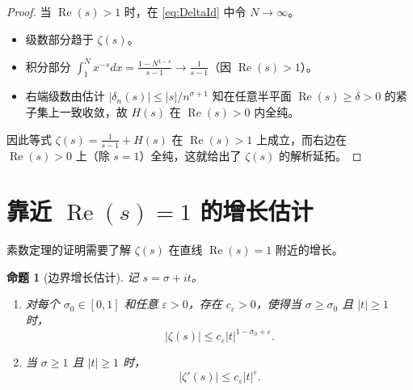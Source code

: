 \documentclass[UTF8]{ctexart}
\newtheorem{proposition}[theorem]{命题}
\numberwithin{equation}{section}
\begin{document}
\begin{proof}
当 $\operatorname{Re}(s)>1$ 时，在 \eqref{eq:DeltaId} 中令 $N\to\infty$。
\begin{itemize}
\item 级数部分趋于 $\zeta(s)$。
\item 积分部分 $\int_{1}^{N} x^{-s}dx = \frac{1-N^{1-s}}{s-1} \to \frac{1}{s-1}$（因 $\operatorname{Re}(s)>1$）。
\item 右端级数由估计 $|\delta_n(s)|\le |s|/n^{\sigma+1}$ 知在任意半平面 $\operatorname{Re}(s)\ge\delta>0$ 的紧子集上一致收敛，故 $H(s)$ 在 $\operatorname{Re}(s)>0$ 内全纯。
\end{itemize}
因此等式 $\zeta(s) = \frac{1}{s-1} + H(s)$ 在 $\operatorname{Re}(s)>1$ 上成立，而右边在 $\operatorname{Re}(s)>0$ 上（除 $s=1$）全纯，这就给出了 $\zeta(s)$ 的解析延拓。
\end{proof}

\section{靠近 $\operatorname{Re}(s)=1$ 的增长估计}

素数定理的证明需要了解 $\zeta(s)$ 在直线 $\operatorname{Re}(s)=1$ 附近的增长。

\begin{proposition}[边界增长估计]\label{prop:ZetaGrowth}
记 $s=\sigma+it$。
\begin{enumerate}
\item 对每个 $\sigma_0\in[0,1]$ 和任意 $\varepsilon>0$，存在 $c_\varepsilon>0$，使得当 $\sigma\ge\sigma_0$ 且 $|t|\ge1$ 时，
\[
|\zeta(s)| \le c_\varepsilon |t|^{1-\sigma_0+\varepsilon}.
\]
\item 当 $\sigma\ge1$ 且 $|t|\ge1$ 时，
\[
|\zeta'(s)| \le c_\varepsilon |t|^{\varepsilon}.
\]
\end{enumerate}
\end{proposition}
\end{document}
